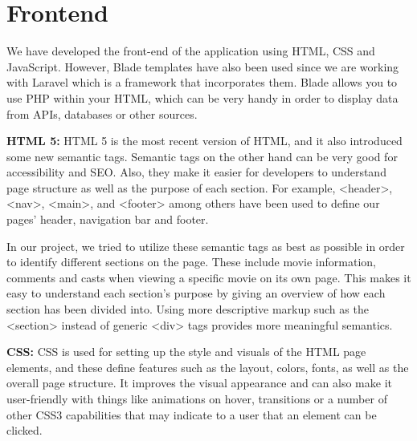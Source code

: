 \section{Frontend}


We have developed the front-end of the application using HTML, CSS and JavaScript.
However, Blade templates have also been used since we are working with Laravel which is a framework that incorporates them.
Blade allows you to use PHP within your HTML, which can be very handy in order to display data from APIs, databases or other sources.\newline

\textbf{HTML 5:} \newline
HTML 5 is the most recent version of HTML, and it also introduced some new semantic tags.
Semantic tags on the other hand can be very good for accessibility and SEO.
Also, they make it easier for developers to understand page structure as well as the purpose of each section.
For example, \textless{}header\textgreater{}, \textless{}nav\textgreater{}, \textless{}main\textgreater{}, and \textless{}footer\textgreater{} among others have been used to define our pages’ header, navigation bar and footer.\newline

In our project, we tried to utilize these semantic tags as best as possible in order to identify different sections on the page.
These include movie information, comments and casts when viewing a specific movie on its own page.
This makes it easy to understand each section’s purpose by giving an overview of how each section has been divided into.
Using more descriptive markup such as the \textless{}section\textgreater{} instead of generic \textless{}div\textgreater{} tags provides more meaningful semantics.\newline

\textbf{CSS:} \newline
CSS is used for setting up the style and visuals of the HTML page elements,
and these define features such as the layout, colors, fonts, as well as the overall page structure.
It improves the visual appearance and can also make it user-friendly with things like animations on hover, transitions or a number of other CSS3 capabilities that may indicate to a user that an element can be clicked.\newline

